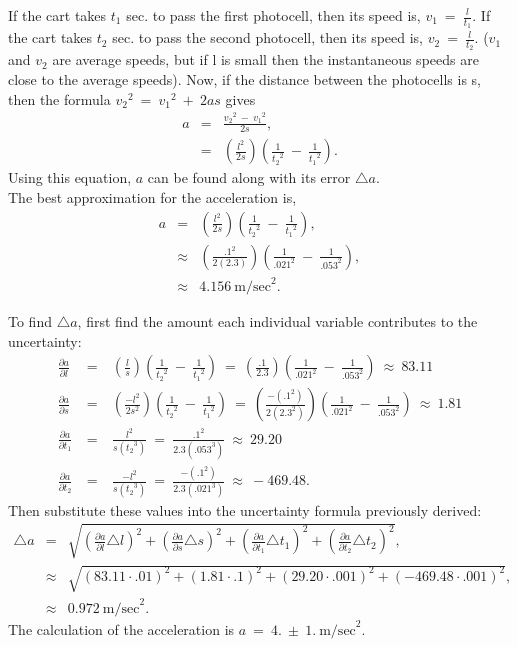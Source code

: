 \documentclass[12pt]{article}
\newcommand{\lp}{\left(}
\newcommand{\rp}{\right)}
\begin{document}
If the cart takes $t_1$ sec.  to pass the first photocell, then its
speed is, $v_1~=~\frac {l}{t_1}$.  If the cart takes $t_2$ sec.  to
pass the second photocell, then its speed is, $v_2~=~\frac{l}{t_2}$.
($v_1$ and $v_2$ are average speeds, but if l is small then the
instantaneous speeds are close to the average speeds).  Now, if the
distance between the photocells is s, then the formula
${v_2}^2~=~{v_1}^2~+~2as$ gives
\begin{eqnarray*}
  a &=& \frac{{v_2}^2~-~{v_1}^2}{2s}, \\
    &=& \left( \frac{l^2}{2s} \right) 
      \left( \frac{1}{{t_2}^2}~-~\frac{1}{{t_1}^2} \right).
\end{eqnarray*}
Using this equation, $a$ can be found along with its error $\triangle{a}$. \\


The best approximation for the acceleration is,
\begin{eqnarray*}
 a & = & \lp\frac{l^2}{2s}\rp
       \lp\frac{1}{{t_2}^2}~-~\frac{1}{{t_1}^2}\rp, \\
   & \approx & \lp\frac{.1^2}{2(2.3)}\rp
               \lp\frac{1}{{.021}^2}~-~\frac{1}{{.053}^2}\rp, \\
   & \approx & 4.156~\mathrm{m/sec}^2.
\end{eqnarray*}

To find $\triangle{a}$, first find the amount each individual variable
contributes to the uncertainty:
\begin{eqnarray*}
\frac{\partial a}{\partial l}~&=&~\left(\frac{l}{s}\right)\left(\frac{1}{{t_2}^2}~-~\frac{1}{{t_1}^2}\right)~=~
\left(\frac{.1}{2.3}\right)\left(\frac{1}{.021^2}~-~\frac{1}{.053^2}\right)~\approx~83.11  \\
\frac{\partial a}{\partial s}~&=&~\left(\frac{-l^2}{2s^2}\right)\left(\frac{1}{{t_2}^2}~-~\frac{1}{{t_1}^2}\right)~=~\left(\frac{-(.1^2)}{2(2.3^2)}\right)\left(\frac{1}{.021^2}~-~\frac{1}{.053^2}\right)~\approx~1.81    \\
\frac{\partial a}{\partial t_1}~&=&~\frac{l^2}{s({t_2}^3)}~=~\frac{.1^2}{2.3(.053^3)}~\approx~29.20   \\
\frac{\partial a}{\partial t_2}~&=&~\frac{-l^2}{s({t_2}^3)}~=~\frac{-(.1^2)}{2.3(.021^3)}~\approx~-469.48.
\end{eqnarray*}
Then substitute these values into the uncertainty formula previously derived:
\begin{eqnarray*}
\triangle{a} & = & \sqrt{
   \lp\frac{\partial a}{\partial l}\triangle{l}\rp^2 +
   \lp\frac{\partial a}{\partial s}\triangle{s}\rp^2 +
   \lp\frac{\partial a}{\partial t_1}\triangle{t_1}\rp^2 +
   \lp\frac{\partial a}{\partial t_2}\triangle{t_2}\rp^2 }, \\
 & \approx & \sqrt{
   \lp 83.11\cdot.01 \rp^2 + \lp 1.81\cdot.1 \rp^2 + \lp 29.20\cdot.001 \rp^2 +
   \lp -469.48\cdot.001 \rp^2}, \\
 & \approx & 0.972 ~ \mathrm{m/sec}^2.
\end{eqnarray*}
The calculation of the acceleration is $a~=~4.~\pm~1. ~ \mathrm{m/sec}^2$.
\end{document}
